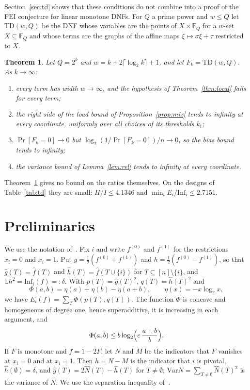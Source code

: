 \documentclass[11pt]{amsart}
\newtheorem{theorem}{Theorem}
\theoremstyle{remark}
\newcommand{\Inf}{\mathrm{Inf}}
\newcommand{\Var}{\mathrm{Var}}
\newcommand{\E}{\mathbb{E}}
\begin{document}
Section~\ref{sec:td} shows that these conditions do not combine into a proof of the FEI conjecture for linear monotone
DNFs. For $Q$ a prime power and $w\le Q$ let $\mathrm{TD}(w,Q)$ be the DNF whose variables are the points of
$X\times\mathbb F_Q$ for a $w$-set $X\subseteq\mathbb F_Q$ and whose terms are the graphs of the affine maps
$\xi\mapsto\sigma\xi+\tau$ restricted to $X$.

\begin{theorem}\label{thm:td}
Let $Q=2^k$ and $w=k+2\lceil\log_2k\rceil+1$, and let $F_k=\mathrm{TD}(w,Q)$. As $k\to\infty$:
\begin{enumerate}
\item every term has width $w\to\infty$, and the hypothesis of Theorem~\ref{thm:local} fails for every term;
\item the right side of the load bound of Proposition~\ref{prop:mix} tends to infinity at every coordinate,
uniformly over all choices of its thresholds $k_t$;
\item $\Pr[F_k=0]\to0$ but $\log_2(1/\Pr[F_k=0])/n\to0$, so the bias bound tends to infinity;
\item the variance bound of Lemma~\ref{lem:rel} tends to infinity at every coordinate.
\end{enumerate}
\end{theorem}

Theorem~\ref{thm:td} gives no bound on the ratios themselves. On the designs of Table~\ref{tab:td} they are small:
$H/I\le4.1346$ and $\min_iE_i/\Inf_i\le2.7151$.

\section{Preliminaries}\label{sec:prelim}

We use the notation of~\cite{Shm6}. Fix $i$ and write $f^{(0)}$ and $f^{(1)}$ for the restrictions $x_i=0$ and $x_i=1$. Put
$g=\tfrac12(f^{(0)}+f^{(1)})$ and $h=\tfrac12(f^{(0)}-f^{(1)})$, so that $\hat g(T)=\hat f(T)$ and $\hat
h(T)=\hat f(T\cup\{i\})$ for $T\subseteq[n]\setminus\{i\}$, and $\E h^2=\Inf_i(f)=:\delta$. With $p(T)=\hat g(T)^2$,
$q(T)=\hat h(T)^2$ and
\[
\Phi(a,b)=\eta(a)+\eta(b)-\eta(a+b),\qquad\eta(x)=-x\log_2x,
\]
we have $E_i(f)=\sum_T\Phi(p(T),q(T))$. The function $\Phi$ is concave and homogeneous of degree one, hence
superadditive, it is increasing in each argument, and
\begin{equation}\label{eq:phiq}
\Phi(a,b)\le b\log_2\Bigl(e\,\frac{a+b}{b}\Bigr).
\end{equation}
If $F$ is monotone and $f=1-2F$, let $N$ and $M$ be the indicators that $F$ vanishes at $x_i=0$ and at $x_i=1$. Then
$h=N-M$ is the indicator that $i$ is pivotal, $\hat h(\emptyset)=\delta$, and $\hat g(T)=2\hat N(T)-\hat h(T)$ for
$T\ne\emptyset$; $\Var N=\sum_{T\ne\emptyset}\hat N(T)^2$ is the variance of $N$. We use the separation inequality of~\cite{Shm6}.
\end{document}
